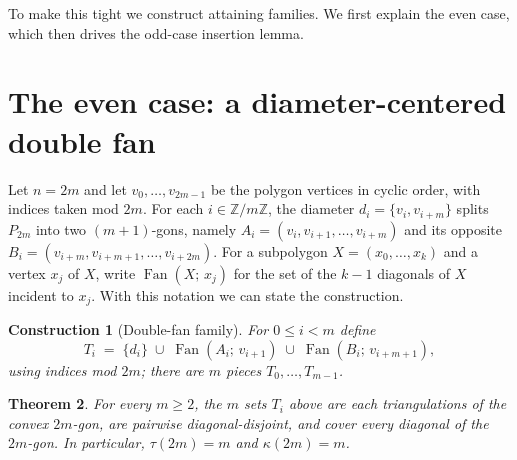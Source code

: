 \documentclass[11pt,a4paper]{article}
\newtheorem{theorem}{Theorem}
\newtheorem{construction}[theorem]{Construction}
\begin{document}
To make this tight we construct attaining families. We first explain the even
case, which then drives the odd-case insertion lemma.

\section{The even case: a diameter-centered double fan}

Let $n=2m$ and let $v_0,\dots,v_{2m-1}$ be the polygon vertices in cyclic
order, with indices taken mod $2m$. For each $i\in \mathbb Z/m\mathbb Z$, the
diameter $d_i = \{v_i, v_{i+m}\}$ splits $P_{2m}$ into two $(m+1)$-gons,
namely $A_i = (v_i, v_{i+1}, \dots, v_{i+m})$ and its opposite
$B_i = (v_{i+m}, v_{i+m+1}, \dots, v_{i+2m})$. For a subpolygon $X=(x_0,\dots,x_k)$ and a vertex $x_j$ of $X$, write
$\operatorname{Fan}(X;\,x_j)$ for the set of the $k-1$ diagonals of $X$
incident to $x_j$. With this notation we can state the construction.

\begin{construction}[Double-fan family]
For $0 \le i < m$ define
\[
T_i \;=\; \{d_i\} \;\cup\; \operatorname{Fan}(A_i;\, v_{i+1}) \;\cup\;
\operatorname{Fan}(B_i;\, v_{i+m+1}),
\]
using indices mod $2m$; there are $m$ pieces $T_0,\dots,T_{m-1}$.
\end{construction}

\begin{theorem}
For every $m \ge 2$, the $m$ sets $T_i$ above are each triangulations of the
convex $2m$-gon, are pairwise diagonal-disjoint, and cover every diagonal of the
$2m$-gon. In particular, $\tau(2m)=m$ and $\kappa(2m)=m$.
\end{theorem}
\end{document}
